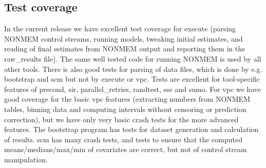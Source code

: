 \subsection{Test coverage}
In the current release we have excellent test coverage for execute (parsing NONMEM control streams, 
running models, tweaking initial estimates, and reading of final estimates from NONMEM output and reporting 
them in the raw\_results file). 
The same well tested code for running NONMEM is used by all other tools. 
There is also good tests for parsing of data files, which is done by e.g. bootstrap and scm but not by execute or
vpc.
Tests are excellent for tool-specific features of precond, sir, parallel\_retries, randtest, sse and sumo. 
For vpc we have good coverage for the basic vpc features (extracting numbers from NONMEM tables, binning data and 
computing intervals without censoring or prediction correction), but we have only very basic crash tests for the 
more advanced features. The bootstrap program has tests for dataset generation and calculation of results.
scm has many crash tests, and tests to ensure that the computed means/medians/max/min of covariates are correct, 
but not of control stream manipulation.

